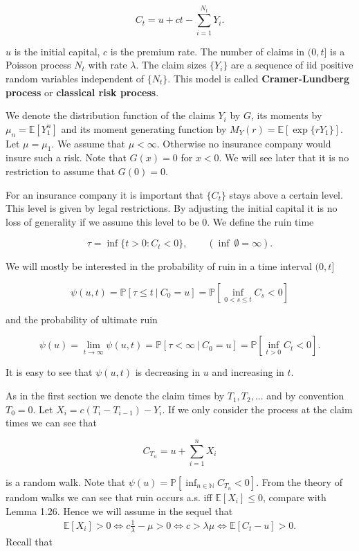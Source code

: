 \documentclass[a4paper,12pt,openany]{book}
\begin{document}
\[
C_t=u+ct-\sum_{i=1}^{N_t}Y_i.
\]

\(u\) is the initial capital, \(c\) is the premium rate. The number of claims in \((0,t]\) is a Poisson process \(N_t\) with rate \(\lambda\). The claim sizes \(\{Y_i\}\) are a sequence of iid positive random variables independent of \(\{N_t\}\). This model is called \textbf{Cramer-Lundberg process} or \textbf{classical risk process}.

We denote the distribution function of the claims \(Y_i\) by \(G\), its moments by \(\mu_n = \mathbb E [Y_1^n]\) and its moment generating function by \(M_Y (r) = \mathbb E [\exp\{rY_1\}]\). Let \(\mu = \mu_1\). We assume that \(\mu < \infty\). Otherwise no insurance company would insure such a risk. Note that \(G(x) = 0\) for \(x < 0\). We will see later that it is no restriction to assume that \(G(0) = 0\).

For an insurance company it is important that \(\{C_t\}\) stays above a certain level. This level is given by legal restrictions. By adjusting the initial capital it is no loss of generality if we assume this level to be 0. We define the ruin time

\[
\tau = \inf\{t>0 : C_t< 0\},\qquad (\inf\ \emptyset =\infty).
\]

We will mostly be interested in the probability of ruin in a time interval \((0, t]\)

\[
\psi(u,t)=\mathbb P [\tau \le t\ \vert\ C_0=u]=\mathbb P\left[\inf_{0<s\le t} C_s<0\right]
\]

and the probability of ultimate ruin

\[
\psi(u)=\lim_{t\to \infty}\psi(u,t) =\mathbb P [\tau <\infty\ \vert\ C_0=u]=\mathbb P\left[\inf_{t>0} C_t<0\right].
\]

It is easy to see that \(\psi(u, t)\) is decreasing in \(u\) and increasing in \(t\).

As in the first section we denote the claim times by \(T_1,T_2,...\) and by convention \(T_0 = 0\). Let \(X_i = c(T_i − T_{i−1}) − Y_i\). If we only consider the process at the claim times we can see that

\[
C_{T_n}=u+\sum_{i=1}^n X_i
\]

is a random walk. Note that \(\psi (u)=\mathbb P[\inf_{n\in\mathbb N}C_{T_n}<0]\). From the theory of random walks we can see that ruin occurs a.s. iff \(\mathbb E [X_i] \le 0\), compare with Lemma 1.26. Hence we will assume in the sequel that
\begin{align*}
\mathbb E[X_i]>0\iff c\frac{1}{\lambda}-\mu>0\iff c> \lambda\mu\iff \mathbb E[C_t-u]>0.
\end{align*}
Recall that
\end{document}
